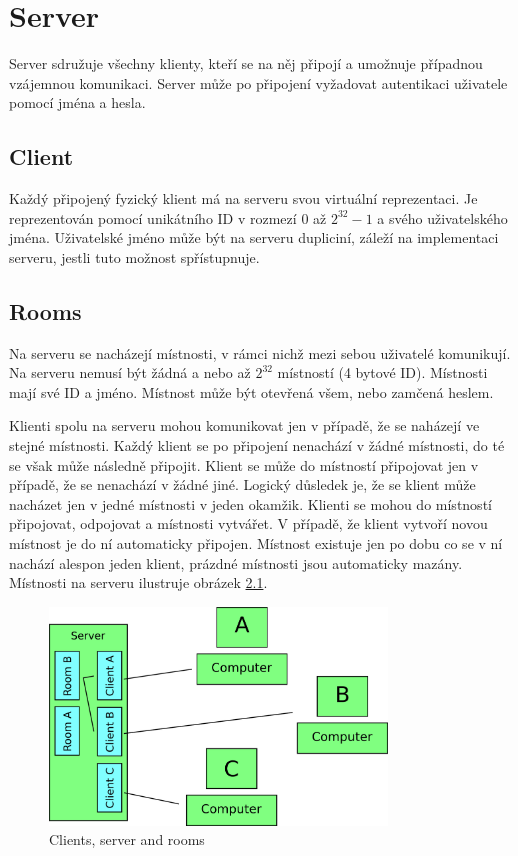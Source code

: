 \part{Server}
\label{server}

Server sdružuje všechny klienty, kteří se na něj připojí a umožnuje případnou vzájemnou komunikaci. Server může po připojení vyžadovat autentikaci uživatele pomocí jména a hesla.

\chapter{Client}

Každý připojený fyzický klient má na serveru svou virtuální reprezentaci. Je reprezentován pomocí unikátního ID v rozmezí $0$ až $2^{32} - 1$ a svého uživatelského jména. Uživatelské jméno může být na serveru dupliciní, záleží na implementaci serveru, jestli tuto možnost spřístupnuje.

\chapter{Rooms}

Na serveru se nacházejí místnosti, v rámci nichž mezi sebou uživatelé komunikují. Na serveru nemusí být žádná a nebo až $2^{32}$ místností (4 bytové ID). Místnosti mají své ID a jméno. Místnost může být otevřená všem, nebo zamčená heslem.

Klienti spolu na serveru mohou komunikovat jen v případě, že se naházejí ve stejné místnosti. Každý klient se po připojení nenachází v žádné místnosti, do té se však může následně připojit. Klient se může do místností připojovat jen v případě, že se nenachází v žádné jiné. Logický důsledek je, že se klient může nacházet jen v jedné místnosti v jeden okamžik. Klienti se mohou do místností připojovat, odpojovat a místnosti vytvářet. V případě, že klient vytvoří novou místnost je do ní automaticky připojen. Místnost existuje jen po dobu co se v ní nachází alespon jeden klient, prázdné místnosti jsou automaticky mazány. Místnosti na serveru ilustruje obrázek \ref{server.pictures.server_client_rooms}.

\begin{figure}[h]
  \centering
  \includegraphics[width=0.80\textwidth]{diagrams/server_client_rooms.png}
  \caption{Clients, server and rooms}
  \label{server.pictures.server_client_rooms}
\end{figure}

